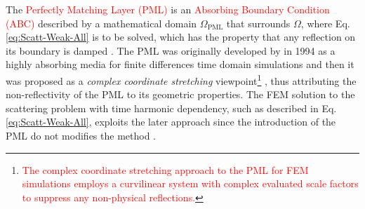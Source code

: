     The \textcolor{red}{Perfectly Matching Layer (PML)} is an \textcolor{red}{Absorbing Boundary Condition (ABC)} described by a mathematical  domain $\Omega_\text{PML}$ \cite{jin_theory_2010} that surrounds  $\Omega$, where Eq. \eqref{eq:Scatt-Weak-All} is to be solved, which has the property that any reflection on its boundary is damped \cite{bondeson_computational_2005,jin_theory_2010,chew_complex_1997}. The PML was originally developed by \citeauthor{berenger_perfectly_1994} \cite{berenger_perfectly_1994} in 1994 as a highly absorbing media for finite differences time domain simulations and then it was proposed as a \textit{complex coordinate stretching} viewpoint\footnote{\textcolor{red}{The complex coordinate stretching approach to the PML for FEM simulations employs a curvilinear system with complex evaluated scale factors to suppress any non-physical reflections.}} \cite{chew_complex_1997}, thus attributing the non-reflectivity of the PML to its geometric properties. The FEM solution to the scattering problem with time harmonic dependency, such as described in Eq. \eqref{eq:Scatt-Weak-All}, exploits the later approach since the introduction of the PML do not modifies the method \cite{jin_theory_2010}.

